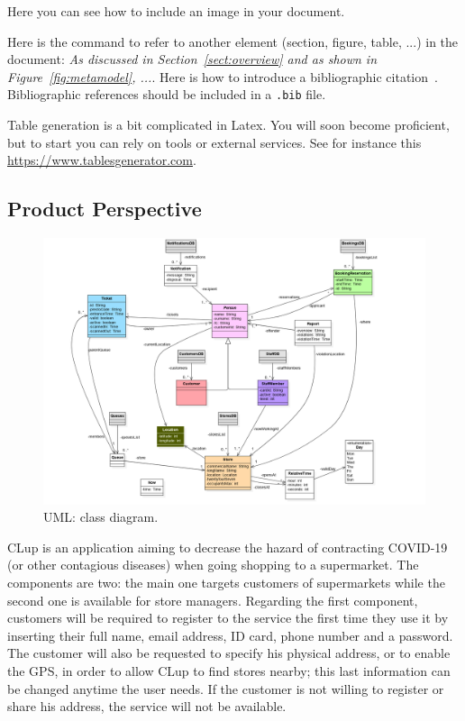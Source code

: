 \sffamily
Here you can see how to include an image in your document.

Here is the command to refer to another element (section, figure, table, ...) in the document: \emph{As discussed in Section~\ref{sect:overview} and as shown in Figure~\ref{fig:metamodel}, ...}. Here is how to introduce a bibliographic citation~\cite{DAM}. Bibliographic references should be included in a \texttt{.bib} file. 

Table generation is a bit complicated in Latex. You will soon become proficient, but to start you can rely on tools or external services. See for instance this \href{https://www.tablesgenerator.com}{https://www.tablesgenerator.com}. \\

\subsection{\sffamily Product Perspective}
\begin{figure}
	\includegraphics[width=\linewidth]{../Diagrams/main_class_diagram.png}
	\caption{UML: class diagram.}
	\label{fig:UML}
\end{figure}
CLup is an application aiming to decrease the hazard of contracting COVID-19 (or other contagious diseases) when going shopping to a supermarket. The components are two: the main one targets customers of supermarkets while the second one is available for store managers.
Regarding the first component, customers will be required to register to the service the first time they use it by inserting their full name, email address, ID card, phone number and a password. The customer will also be requested to specify his physical address, or to enable the GPS, in order to allow CLup to find stores nearby; this last information can be changed anytime the user needs. If the customer is not willing to register or share his address, the service will not be available.
